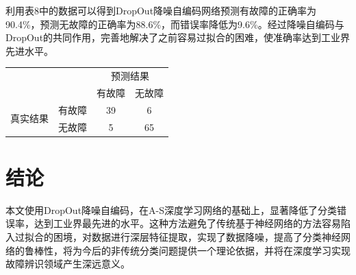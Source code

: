 \documentclass{ctacn}%
\begin{document}
\begin{multicols}{2}
利用表8中的数据可以得到DropOut降噪自编码网络预测有故障的正确率为90.4\%，预测无故障的正确率为88.6\%，而错误率降低为9.6\%。经过降噪自编码与DropOut的共同作用，完善地解决了之前容易过拟合的困难，使准确率达到工业界先进水平。

\begin{center}
	\label{tab:8}
	\begin{tabular} {cccc}\toprule
		\multirow{2}{*}[-2pt]{}&\multirow{2}{*}[-2pt]{}&\multicolumn{2}{c}{预测结果}\\
		\cmidrule(lr){3-4}
		&&有故障&无故障\\\hline
		\multirow{2}{*}[-2pt]{真实结果}&有故障&39&6\\
		&无故障&5&65\\
		\bottomrule
\end{tabular}\end{center}

\section{结\quad 论}

本文使用DropOut降噪自编码，在A-S深度学习网络的基础上，显著降低了分类错误率，达到工业界最先进的水平。这种方法避免了传统基于神经网络的方法容易陷入过拟合的困境，对数据进行深层特征提取，实现了数据降噪，提高了分类神经网络的鲁棒性，将为今后的非传统分类问题提供一个理论依据，并将在深度学习实现故障辨识领域产生深远意义。



\addtolength{\itemsep}{-0.7em}


\end{multicols}
\end{document}
